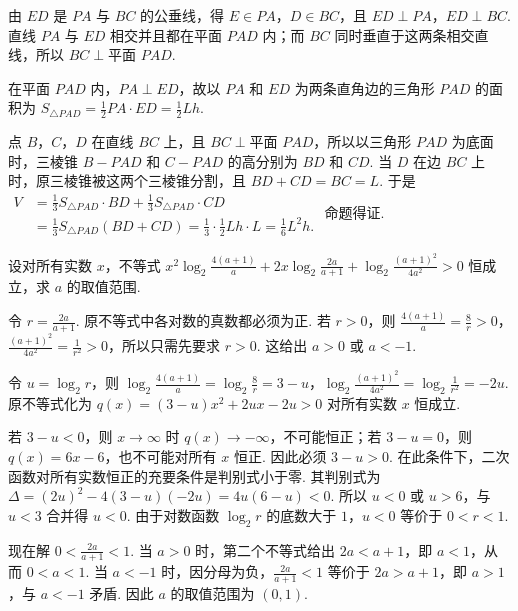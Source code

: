 \begin{solution}
由 \(ED\) 是 \(PA\) 与 \(BC\) 的公垂线，得 \(E\in PA\)，\(D\in BC\)，且 \(ED\perp PA\)，\(ED\perp BC\). 直线 \(PA\) 与 \(ED\) 相交并且都在平面 \(PAD\) 内；而 \(BC\) 同时垂直于这两条相交直线，所以 \(BC\perp\text{平面 }PAD\).

在平面 \(PAD\) 内，\(PA\perp ED\)，故以 \(PA\) 和 \(ED\) 为两条直角边的三角形 \(PAD\) 的面积为 \(S_{\triangle PAD}=\frac12PA\cdot ED=\frac12Lh\).

点 \(B\)，\(C\)，\(D\) 在直线 \(BC\) 上，且 \(BC\perp\text{平面 }PAD\)，所以以三角形 \(PAD\) 为底面时，三棱锥 \(B-PAD\) 和 \(C-PAD\) 的高分别为 \(BD\) 和 \(CD\). 当 \(D\) 在边 \(BC\) 上时，原三棱锥被这两个三棱锥分割，且 \(BD+CD=BC=L\). 于是
\(\begin{aligned}
V&=\frac13S_{\triangle PAD}\cdot BD+\frac13S_{\triangle PAD}\cdot CD\\
&=\frac13S_{\triangle PAD}(BD+CD)=\frac13\cdot\frac12Lh\cdot L=\frac16L^2h.
\end{aligned}\)
命题得证.
\end{solution}

\begin{problem}
设对所有实数 \(x\)，不等式 \(x^2\log_2 \frac{4(a + 1)}{a} + 2x\log_2 \frac{2a}{a + 1} + \log_2 \frac{(a + 1)^2}{4a^2} > 0\) 恒成立，求 \(a\) 的取值范围.
\end{problem}

\begin{solution}
令 \(r=\frac{2a}{a+1}\). 原不等式中各对数的真数都必须为正. 若 \(r>0\)，则 \(\frac{4(a+1)}a=\frac8r>0\)，\(\frac{(a+1)^2}{4a^2}=\frac1{r^2}>0\)，所以只需先要求 \(r>0\). 这给出 \(a>0\) 或 \(a<-1\).

令 \(u=\log_2r\)，则 \(\log_2\frac{4(a+1)}a=\log_2\frac8r=3-u\)，\(\log_2\frac{(a+1)^2}{4a^2}=\log_2\frac1{r^2}=-2u\). 原不等式化为 \(q(x)=(3-u)x^2+2ux-2u>0\) 对所有实数 \(x\) 恒成立.

若 \(3-u<0\)，则 \(x\to\infty\) 时 \(q(x)\to-\infty\)，不可能恒正；若 \(3-u=0\)，则 \(q(x)=6x-6\)，也不可能对所有 \(x\) 恒正. 因此必须 \(3-u>0\). 在此条件下，二次函数对所有实数恒正的充要条件是判别式小于零. 其判别式为 \(\Delta=(2u)^2-4(3-u)(-2u)=4u(6-u)<0\). 所以 \(u<0\) 或 \(u>6\)，与 \(u<3\) 合并得 \(u<0\). 由于对数函数 \(\log_2 r\) 的底数大于 \(1\)，\(u<0\) 等价于 \(0<r<1\).

现在解 \(0<\frac{2a}{a+1}<1\). 当 \(a>0\) 时，第二个不等式给出 \(2a<a+1\)，即 \(a<1\)，从而 \(0<a<1\). 当 \(a<-1\) 时，因分母为负，\(\frac{2a}{a+1}<1\) 等价于 \(2a>a+1\)，即 \(a>1\)，与 \(a<-1\) 矛盾. 因此 \(a\) 的取值范围为 \((0,1)\).
\end{solution}

